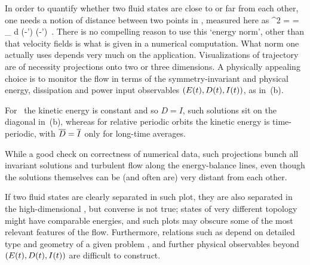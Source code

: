 \documentclass{jfm}
\begin{document}
In order to quantify whether two fluid states are close to or far from
each other, one needs a notion of distance between two points in
\statesp, measured here as
\beq
  ^2  =  =
\int_\bCell \! d \bx \;
(-') \cdot (-')
\,.
There is no compelling reason to use this {`energy norm'}, other than
that velocity fields is what is given in a numerical computation. What
norm one actually uses depends very much on the application.
Visualizations of trajectory  are of necessity
projections onto two or three dimensions. A physically appealing choice
is to monitor the flow in terms of the
symmetry-invariant and physical energy, dissipation and power input
observables $(E(t),D(t),I(t))$, as in
\,(b).

For \reqva\ the kinetic
energy is constant and so $D=I$, such solutions sit on the diagonal in
\,(b), whereas for relative periodic orbits the kinetic
energy is time-periodic, with $\overline{D}=\overline{I}$ only for
long-time averages.

While a good check on correctness of numerical data, such projections
bunch all invariant solutions and turbulent flow along the energy-balance
lines, even though the solutions themselves can be (and often are) very
distant from each other.

If two fluid states are clearly separated in
such plot, they are also separated in the high-dimensional \statesp, but
converse is not true; states of very different topology might have
comparable energies, and such plots may obscure some of the most relevant
features of the flow. Furthermore, relations such as 
depend on detailed type and geometry of a given problem
\citep{ksgreene88,SCD07}, and further physical observables beyond
$(E(t),D(t),I(t))$ are difficult to construct.
\end{document}
